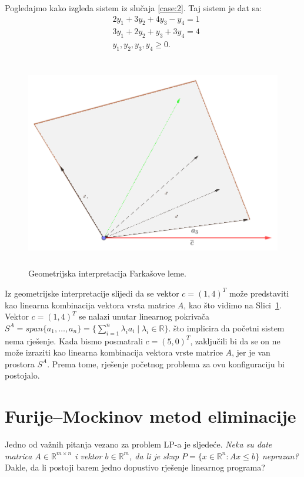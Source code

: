 \documentclass[b5paper, utf8, 11pt, colorlinks]{book}
\theoremstyle{definition}
\begin{document}
Pogledajmo kako izgleda sistem iz slučaja \ref{case:2}. Taj sistem je dat sa:
\begin{align*}
	&2 y_1 + 3 y_2 + 4 y_3 - y_4 = 1\\
	&3y_1 + 2 y_2 + y_3 + 3 y_4 = 4 \\
	& y_1, y_2, y_3, y_4 \geq 0. 
\end{align*}
\begin{figure}[!ht]
	\centering
	\includegraphics[width=350pt, height=260pt]{farkas-geometry.eps}
	\vspace{-1cm}
	\caption{Geometrijska interpretacija Farkašove leme.}
	\label{fig:farkas-slika}
\end{figure}
Iz geometrijske interpretacije slijedi da se vektor $c =(1,4)^T$ može predstaviti kao linearna kombinacija vektora vrsta matrice $A$, kao što vidimo na Slici~\ref{fig:farkas-slika}. Vektor $c =(1,4)^T$ se nalazi unutar linearnog pokrivača $S^A = span\{a_1, \ldots, a_n \} = \{\sum_{i=1}^n \lambda_i a_i \mid \lambda_i \in \mathbb{R}\}$. što implicira da početni sistem nema rješenje. 
Kada bismo posmatrali $c=(5,0)^T$, zaključili bi da se on ne može izraziti kao linearna kombinacija vektora vrste matrice $A$, jer je van prostora  $S^A $. Prema tome, rješenje početnog problema za ovu konfiguraciju bi postojalo.  

\section{Furije–Mockinov metod eliminacije}
Jedno od važnih pitanja vezano za problem  LP-a je sljedeće. 
\emph{Neka su date matrica $A \in \mathbb{R}^{m \times n}$ i vektor $b \in \mathbb{R}^m$, da li je skup $P = \{x \in \mathbb{R}^n \colon A x \leq b\}$ neprazan?} Dakle, da li postoji barem jedno dopustivo rješenje linearnog programa? 	
\end{document}
